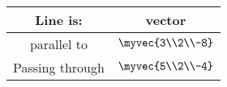 \begin{tabular}[12pt]{ |c| c|}
    \hline
    \textbf{Line is:} & \textbf{vector}\\ 
    \hline
    parallel to & $\myvec{3\\2\\-8}$\\
    \hline
    Passing through & $\myvec{5\\2\\-4}$\\
    \hline
    \end{tabular}